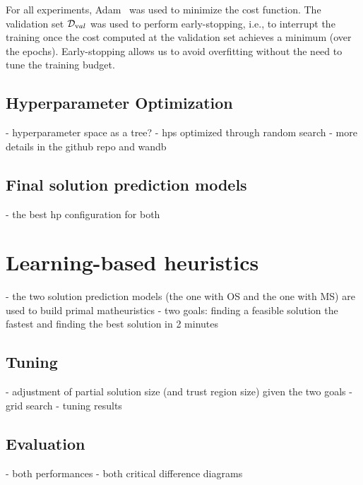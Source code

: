 For all experiments, Adam~\cite{kingmaAdamMethodStochastic2015} was used to minimize the cost function.
The validation set $\mathcal{D}_{\textrm val}$ was used to perform early-stopping, i.e., to interrupt the training once the cost computed at the validation set achieves a minimum (over the epochs).
Early-stopping allows us to avoid overfitting without the need to tune the training budget.

\subsection{Hyperparameter Optimization}

- hyperparameter space as a tree?
- hps optimized through random search
- more details in the github repo and wandb

\subsection{Final solution prediction models}

- the best hp configuration for both 

\section{Learning-based heuristics}

- the two solution prediction models (the one with OS and the one with MS) are used to build primal matheuristics
- two goals: finding a feasible solution the fastest and finding the best solution in 2 minutes

\subsection{Tuning}

- adjustment of partial solution size (and trust region size) given the two goals
- grid search
- tuning results

\subsection{Evaluation}

- both performances
- both critical difference diagrams

